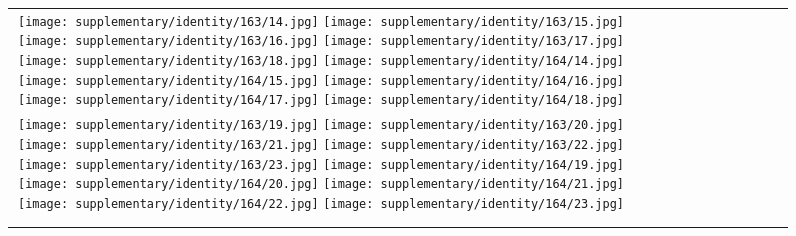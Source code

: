 \begin{figure*}[tb!]
{\begin{tabular}{c c c c c c c c c c c c }
\tabularnewline
  \texttt{[image: supplementary/identity/163/14.jpg]}
  \texttt{[image: supplementary/identity/163/15.jpg]}
  \texttt{[image: supplementary/identity/163/16.jpg]}
  \texttt{[image: supplementary/identity/163/17.jpg]}
  \texttt{[image: supplementary/identity/163/18.jpg]}
    \hspace{5mm}
  \texttt{[image: supplementary/identity/164/14.jpg]}
  \texttt{[image: supplementary/identity/164/15.jpg]}
  \texttt{[image: supplementary/identity/164/16.jpg]}
  \texttt{[image: supplementary/identity/164/17.jpg]}
  \texttt{[image: supplementary/identity/164/18.jpg]}

\tabularnewline
  \texttt{[image: supplementary/identity/163/19.jpg]}
  \texttt{[image: supplementary/identity/163/20.jpg]}
  \texttt{[image: supplementary/identity/163/21.jpg]}
  \texttt{[image: supplementary/identity/163/22.jpg]}
  \texttt{[image: supplementary/identity/163/23.jpg]}
    \hspace{5mm}
  \texttt{[image: supplementary/identity/164/19.jpg]}
  \texttt{[image: supplementary/identity/164/20.jpg]}
  \texttt{[image: supplementary/identity/164/21.jpg]}
  \texttt{[image: supplementary/identity/164/22.jpg]}
  \texttt{[image: supplementary/identity/164/23.jpg]}
    \tabularnewline

 \hspace{0.5mm}
  \tabularnewline
\vspace{2mm}
\vspace{-2\baselineskip}
\end{tabular}}
\vspace{-0.8cm}
\label{fig:sup1a}
\vspace{-16mm}
\end{figure*}%